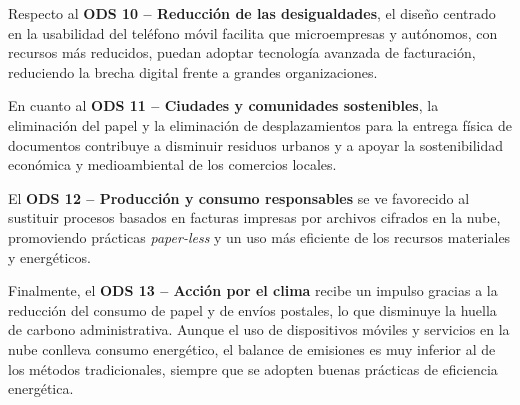 \begin{large}
Respecto al \textbf{ODS 10 – Reducción de las desigualdades}, el diseño centrado en la usabilidad del teléfono móvil facilita que microempresas y autónomos, con recursos más reducidos, puedan adoptar tecnología avanzada de facturación, reduciendo la brecha digital frente a grandes organizaciones. 

En cuanto al \textbf{ODS 11 – Ciudades y comunidades sostenibles}, la eliminación del papel y la eliminación de desplazamientos para la entrega física de documentos contribuye a disminuir residuos urbanos y a apoyar la sostenibilidad económica y medioambiental de los comercios locales. 

El \textbf{ODS 12 – Producción y consumo responsables} se ve favorecido al sustituir procesos basados en facturas impresas por archivos cifrados en la nube, promoviendo prácticas \textit{paper-less} y un uso más eficiente de los recursos materiales y energéticos. 

Finalmente, el \textbf{ODS 13 – Acción por el clima} recibe un impulso gracias a la reducción del consumo de papel y de envíos postales, lo que disminuye la huella de carbono administrativa. Aunque el uso de dispositivos móviles y servicios en la nube conlleva consumo energético, el balance de emisiones es muy inferior al de los métodos tradicionales, siempre que se adopten buenas prácticas de eficiencia energética.

\end{large}
